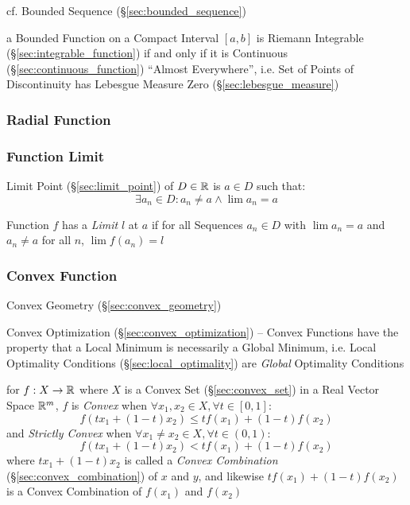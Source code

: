 \fist cf. Bounded Sequence (\S\ref{sec:bounded_sequence})

a Bounded Function on a Compact Interval $[a,b]$ is Riemann Integrable
(\S\ref{sec:integrable_function}) if and only if it is Continuous
(\S\ref{sec:continuous_function}) ``Almost Everywhere'', i.e. Set of Points of
Discontinuity has Lebesgue Measure Zero (\S\ref{sec:lebesgue_measure})



\subsubsection{Radial Function}\label{sec:radial_function}

\subsubsection{Function Limit}\label{sec:function_limit}

Limit Point (\S\ref{sec:limit_point}) of $D \in \mathbb{R}$ is $a \in D$
such that:
\[
  \exists a_n \in D : a_n \neq a \wedge \lim a_n = a
\]

Function $f$ has a \emph{Limit} $l$ at $a$ if for all Sequences $a_n
\in D$ with $\lim a_n = a$ and $a_n \neq a$ for all $n$, $\lim f(a_n)
= l$



\subsubsection{Convex Function}\label{sec:convex_function}

\fist Convex Geometry (\S\ref{sec:convex_geometry})

\fist Convex Optimization (\S\ref{sec:convex_optimization}) -- Convex Functions
have the property that a Local Minimum is necessarily a Global Minimum, i.e.
Local Optimality Conditions (\S\ref{sec:local_optimality}) are \emph{Global}
Optimality Conditions

for $f : X \rightarrow \mathbb{R}$ where $X$ is a Convex Set
(\S\ref{sec:convex_set}) in a Real Vector Space $\mathbb{R}^m$, $f$ is
\emph{Convex} when $\forall x_1, x_2 \in X, \forall t \in [0,1]$:
\[
  f(tx_1 + (1-t)x_2) \leq tf(x_1) + (1-t)f(x_2)
\]
and \emph{Strictly Convex} when $\forall x_1 \neq x_2 \in X, \forall t \in
(0,1)$:
\[
  f(tx_1 + (1-t)x_2) < tf(x_1) + (1-t)f(x_2)
\]
where $tx_1 + (1-t)x_2$ is called a \emph{Convex Combination}
(\S\ref{sec:convex_combination}) of $x$ and $y$, and likewise $tf(x_1) +
(1-t)f(x_2)$ is a Convex Combination of $f(x_1)$ and $f(x_2)$

